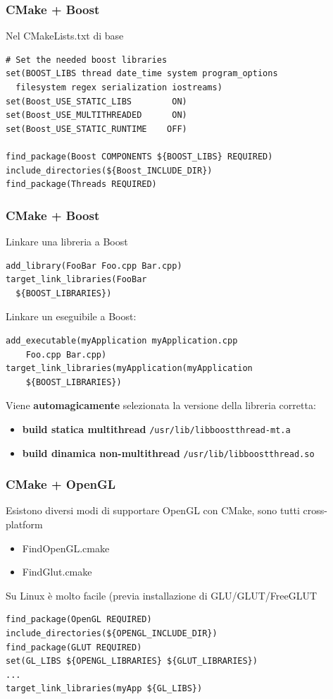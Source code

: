 \documentclass[10pt] {beamer}
\begin{document}
\begin{frame}[fragile]
 \frametitle{CMake + Boost}
Nel CMakeLists.txt di base
\begin{verbatim}
# Set the needed boost libraries 
set(BOOST_LIBS thread date_time system program_options 
  filesystem regex serialization iostreams)
set(Boost_USE_STATIC_LIBS        ON)
set(Boost_USE_MULTITHREADED      ON)
set(Boost_USE_STATIC_RUNTIME    OFF)

find_package(Boost COMPONENTS ${BOOST_LIBS} REQUIRED)
include_directories(${Boost_INCLUDE_DIR})
find_package(Threads REQUIRED)
\end{verbatim}

\end{frame}


\begin{frame}[fragile]
 \frametitle{CMake + Boost}
Linkare una libreria a Boost
\begin{verbatim}
add_library(FooBar Foo.cpp Bar.cpp)
target_link_libraries(FooBar 
  ${BOOST_LIBRARIES})
\end{verbatim}
Linkare un eseguibile a Boost:
\begin{verbatim}
add_executable(myApplication myApplication.cpp 
    Foo.cpp Bar.cpp)
target_link_libraries(myApplication(myApplication 
    ${BOOST_LIBRARIES})
\end{verbatim}
Viene \textbf{automagicamente} selezionata la versione della libreria corretta:
\begin{itemize}
\item \textbf{build statica multithread} \verb_/usr/lib/libboost_\verb_thread-mt.a_
\item \textbf{build dinamica non-multithread} \verb_/usr/lib/libboost_\verb_thread.so_
\end{itemize}
\end{frame}


\begin{frame}[fragile]
 \frametitle{CMake + OpenGL}
Esistono diversi modi di supportare OpenGL con CMake, sono tutti cross-platform
\begin{itemize}
 \item FindOpenGL.cmake
 \item FindGlut.cmake
\end{itemize}

Su Linux è molto facile (previa installazione di GLU/GLUT/FreeGLUT
\begin{verbatim}
find_package(OpenGL REQUIRED)
include_directories(${OPENGL_INCLUDE_DIR})
find_package(GLUT REQUIRED)
set(GL_LIBS ${OPENGL_LIBRARIES} ${GLUT_LIBRARIES})
...
target_link_libraries(myApp ${GL_LIBS})
\end{verbatim}
\end{frame}
\end{document}
